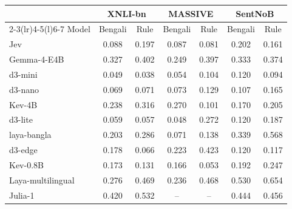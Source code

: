 \begin{tabular}{@{}lcccccc@{}}\toprule
 & \multicolumn{2}{c}{XNLI-bn} & \multicolumn{2}{c}{MASSIVE} & \multicolumn{2}{c}{SentNoB} \\\cmidrule(lr){2-3}\cmidrule(lr){4-5}\cmidrule(l){6-7}
Model & Bengali & Rule & Bengali & Rule & Bengali & Rule \\\midrule
Jev & 0.088 & 0.197 & 0.087 & 0.081 & 0.202 & 0.161 \\
Gemma-4-E4B & 0.327 & 0.402 & 0.249 & 0.397 & 0.333 & 0.374 \\
d3-mini & 0.049 & 0.038 & 0.054 & 0.104 & 0.120 & 0.094 \\
d3-nano & 0.069 & 0.071 & 0.073 & 0.129 & 0.107 & 0.165 \\
Kev-4B & 0.238 & 0.316 & 0.270 & 0.101 & 0.170 & 0.205 \\
d3-lite & 0.059 & 0.057 & 0.048 & 0.272 & 0.120 & 0.187 \\
laya-bangla & 0.203 & 0.286 & 0.071 & 0.138 & 0.339 & 0.568 \\
d3-edge & 0.178 & 0.066 & 0.223 & 0.423 & 0.120 & 0.117 \\
Kev-0.8B & 0.173 & 0.131 & 0.166 & 0.053 & 0.192 & 0.247 \\
Laya-multilingual & 0.276 & 0.469 & 0.236 & 0.468 & 0.530 & 0.654 \\
Julia-1 & 0.420 & 0.532 & -- & -- & 0.444 & 0.456 \\
\bottomrule\end{tabular}
